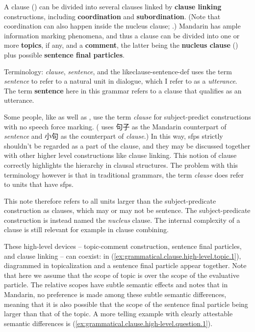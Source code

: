 \documentclass[UTF8, a4paper, oneside, scheme=plain, 12pt]{ctexrep}
\newcommand*{\citepage}[1]{p.~{#1}}
\newcommand*{\concept}[1]{\textbf{#1}}
\newcommand*{\term}[1]{\emph{#1}}
\begin{document}
A clause () can be divided into several clauses 
linked by \concept{clause linking} constructions,
including \concept{coordination} and \concept{subordination}.
(Note that coordination can also happen inside the nucleus clause;
.)
Mandarin has ample information marking phenomena,
and thus a clause can be divided into
one or more \concept{topics}, if any, and a \concept{comment},
the latter being the \concept{nucleus clause} ()
plus possible \concept{sentence final particles}.

\begin{theorybox}{Terminology: \term{clause}, \term{sentence}, and the like}{clause-sentence-def}
    \citet{cgel} uses the term \term{sentence} 
    to refer to a natural unit in dialogue,
    which I refer to as a \term{utterance}.
    The term \concept{sentence} here in this grammar refers to 
    a clause that qualifies as an utterance. 

    Some people, like \citet[\citepage{140}]{deng2010formal}
    as well as \citet{dixon2009basic},
    use the term \term{clause} for subject-predict constructions 
    with no speech force marking.
    (\citet{deng2010formal} uses 句子 as the Mandarin counterpart of \term{sentence}
    and 小句 as the counterpart of \term{clause}.)
    In this way, \acl{sfp}s strictly shouldn't be
    regarded as a part of the clause, 
    and they may be discussed together with 
    other higher level constructions like clause linking. 
    This notion of clause correctly highlights the hierarchy in clausal structures.
    The problem with this terminology however is that in traditional grammars,
    the term \term{clause} does refer to units that have \ac{sfp}s.
    
    This note therefore refers to all units larger than the 
    subject-predicate construction as clauses, 
    which may or may not be sentence.
    The subject-predicate construction is instead named the \emph{nucleus} clause.
    The internal complexity of a clause 
    is still relevant for example in clause combining.
\end{theorybox}

These high-level devices -- topic-comment construction, sentence final particles, and clause linking
-- can coexist: in (\ref{ex:grammatical.clause.high-level.topic.1}),
diagrammed in 
topicalization and a sentence final particle appear together.
Note that here we assume that the scope of topic is over the scope of the evaluative particle.
The relative scopes have subtle semantic effects and \citet{pan2015mandarin} notes that in Mandarin,
no preference is made among these subtle semantic differences,
meaning that it is also possible that the scope of the sentence final particle
being larger than that of the topic.
A more telling example with clearly attestable semantic differences is (\ref{ex:grammatical.clause.high-level.question.1}).
\end{document}
